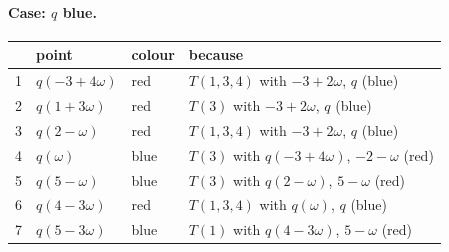 \paragraph{Case: $q$ blue.}
\begin{center}\small\begin{longtable}{rlll}\toprule & point & colour & because\\\midrule\endhead
1 & $q(-3+4\omega)$ & red & $T(1,3,4)$ with $-3+2\omega$, $q$ (blue)\\
2 & $q(1+3\omega)$ & red & $T(3)$ with $-3+2\omega$, $q$ (blue)\\
3 & $q(2-\omega)$ & red & $T(1,3,4)$ with $-3+2\omega$, $q$ (blue)\\
4 & $q(\omega)$ & blue & $T(3)$ with $q(-3+4\omega)$, $-2-\omega$ (red)\\
5 & $q(5-\omega)$ & blue & $T(3)$ with $q(2-\omega)$, $5-\omega$ (red)\\
6 & $q(4-3\omega)$ & red & $T(1,3,4)$ with $q(\omega)$, $q$ (blue)\\
7 & $q(5-3\omega)$ & blue & $T(1)$ with $q(4-3\omega)$, $5-\omega$ (red)\\
\bottomrule\end{longtable}\end{center}
